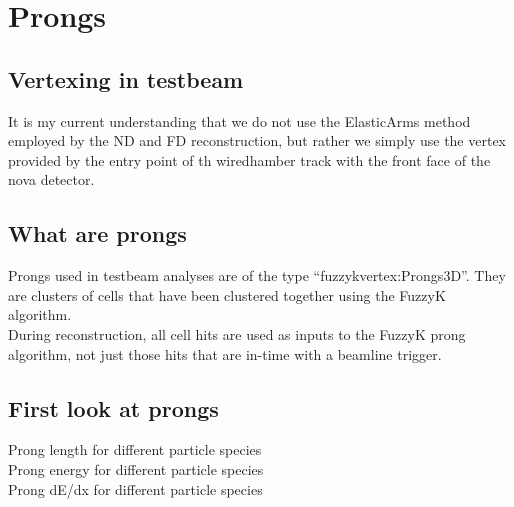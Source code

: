 
\section{Prongs}

\subsection{Vertexing in testbeam}

It is my current understanding that we do not use the ElasticArms method employed by the ND and FD reconstruction, but rather we simply use the vertex provided by the entry point of th wiredhamber track with the front face of the nova detector.

\subsection{What are prongs}

Prongs used in testbeam analyses are of the type ``fuzzykvertex:Prongs3D''. They are clusters of cells that have been clustered together using the FuzzyK algorithm.\\[1ex]

During reconstruction, all cell hits are used as inputs to the FuzzyK prong algorithm, not just those hits that are in-time with a beamline trigger.

\subsection{First look at prongs}

Prong length for different particle species\\

Prong energy for different particle species\\

Prong dE/dx for different particle species\\


%
%
%
%



